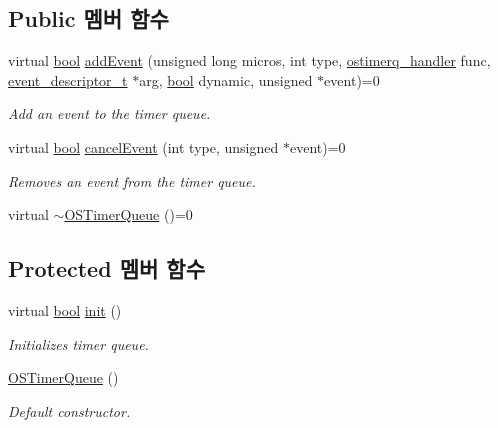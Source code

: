 \subsection*{Public 멤버 함수}
\begin{DoxyCompactItemize}
\item 
virtual \hyperlink{avb__gptp_8h_af6a258d8f3ee5206d682d799316314b1}{bool} \hyperlink{class_o_s_timer_queue_aedd4a6892651a861ca78a9862065b539}{add\+Event} (unsigned long micros, int type, \hyperlink{avbts__ostimerq_8hpp_ac7e0bdbe70d3e2951c02906cf4ed3aed}{ostimerq\+\_\+handler} func, \hyperlink{structevent__descriptor__t}{event\+\_\+descriptor\+\_\+t} $\ast$arg, \hyperlink{avb__gptp_8h_af6a258d8f3ee5206d682d799316314b1}{bool} dynamic, unsigned $\ast$event)=0
\begin{DoxyCompactList}\small\item\em Add an event to the timer queue. \end{DoxyCompactList}\item 
virtual \hyperlink{avb__gptp_8h_af6a258d8f3ee5206d682d799316314b1}{bool} \hyperlink{class_o_s_timer_queue_a781246a92c0fa7d331f94829e937243f}{cancel\+Event} (int type, unsigned $\ast$event)=0
\begin{DoxyCompactList}\small\item\em Removes an event from the timer queue. \end{DoxyCompactList}\item 
virtual \hyperlink{class_o_s_timer_queue_ab95f195c8bc04f22c0456a0c1a595325}{$\sim$\+O\+S\+Timer\+Queue} ()=0
\end{DoxyCompactItemize}
\subsection*{Protected 멤버 함수}
\begin{DoxyCompactItemize}
\item 
virtual \hyperlink{avb__gptp_8h_af6a258d8f3ee5206d682d799316314b1}{bool} \hyperlink{class_o_s_timer_queue_ac4ae554e242cee73c504038d88855eba}{init} ()
\begin{DoxyCompactList}\small\item\em Initializes timer queue. \end{DoxyCompactList}\item 
\hyperlink{class_o_s_timer_queue_a4eb949616b4aae2694fded375f25e65b}{O\+S\+Timer\+Queue} ()
\begin{DoxyCompactList}\small\item\em Default constructor. \end{DoxyCompactList}\end{DoxyCompactItemize}


